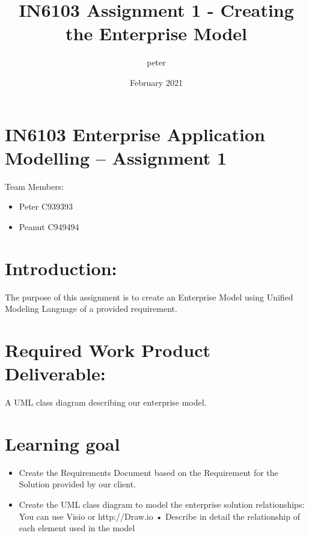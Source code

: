\documentclass{article}
\title{IN6103 Assignment 1 - Creating the Enterprise Model}
\author{peter }
\date{February 2021}
\begin{document}
\maketitle

\section{IN6103 Enterprise Application Modelling – Assignment 1}

Team Members:
\begin{itemize}
    \item Peter C939393
    \item Peanut C949494
\end{itemize}

\section{Introduction:}
The purpose of this assignment is to create an Enterprise Model using Unified Modeling Language of a provided requirement.

\section{Required Work Product Deliverable:}

A UML class diagram describing our enterprise model. 

\section{Learning goal}
\begin{itemize}
    \item Create the Requirements Document based on the Requirement for the Solution provided by our client.
    \item Create the UML class diagram to model the enterprise solution relationships: You can use Visio or http://Draw.io
• Describe in detail the relationship of each element used in the model
\end{itemize}
\end{document}
